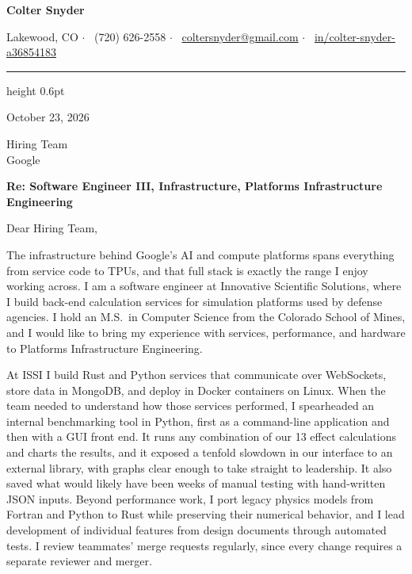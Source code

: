 \documentclass[letterpaper,11pt]{article}
\begin{document}
\begin{center}
  {\Huge\bfseries Colter Snyder}\par\vspace{4pt}
  \footnotesize
  Lakewood, CO \enspace$\cdot$\enspace
  \faPhone*\ (720) 626-2558 \enspace$\cdot$\enspace
  \faEnvelope\ \href{mailto:coltersnyder@gmail.com}{coltersnyder@gmail.com} \enspace$\cdot$\enspace
  \mbox{\faLinkedin\ \href{https://www.linkedin.com/in/colter-snyder-a36854183/}{in/colter-snyder-a36854183}}
\end{center}
{\color{accent}\hrule height 0.6pt}
\vspace{6pt}

October 23, 2026

Hiring Team\\
Google

\textbf{Re: Software Engineer III, Infrastructure, Platforms Infrastructure Engineering}

Dear Hiring Team,

The infrastructure behind Google's AI and compute platforms spans everything from service code to
TPUs, and that full stack is exactly the range I enjoy working across. I am a software engineer at
Innovative Scientific Solutions, where I build back-end calculation services for simulation platforms
used by defense agencies. I hold an M.S.\ in Computer Science from the Colorado School of Mines, and I
would like to bring my experience with services, performance, and hardware to Platforms
Infrastructure Engineering.

At ISSI I build Rust and Python services that communicate over WebSockets, store data in MongoDB, and
deploy in Docker containers on Linux. When the team needed to understand how those services performed,
I spearheaded an internal benchmarking tool in Python, first as a command-line application and then
with a GUI front end. It runs any combination of our 13 effect calculations and charts the results,
and it exposed a tenfold slowdown in our interface to an external library, with graphs clear enough to
take straight to leadership. It also saved what would likely have been weeks of manual testing with
hand-written JSON inputs. Beyond performance work, I port legacy physics
models from Fortran and Python to Rust while preserving their numerical behavior, and I lead development of
individual features from design documents through automated tests. I review teammates' merge
requests regularly, since every change requires a separate reviewer and merger.
\end{document}
